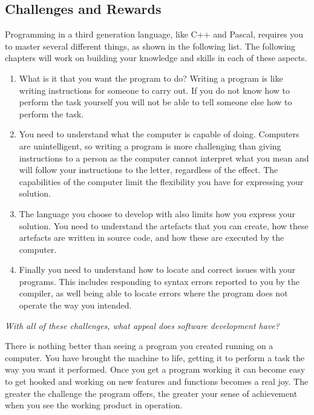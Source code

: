 \clearpage
\subsection{Challenges and Rewards} %
\label{sub:challenges_and_rewards}


Programming in a third generation language, like C++ and Pascal, requires you to master several different things, as shown in the following list. The following chapters will work on building your knowledge and skills in each of these aspects.

\begin{enumerate}
  \item What is it that you want the program to do? Writing a program is like writing instructions for someone to carry out. If you do not know how to perform the task yourself you will not be able to tell someone else how to perform the task.
  \item You need to understand what the computer is capable of doing. Computers are unintelligent, so writing a program is more challenging than giving instructions to a person as the computer cannot interpret what you mean and will follow your instructions to the letter, regardless of the effect. The capabilities of the computer limit the flexibility you have for expressing your solution.
  \item The language you choose to develop with also limits how you express your solution. You need to understand the artefacts that you can create, how these artefacts are written in source code, and how these are executed by the computer.
  \item Finally you need to understand how to locate and correct issues with your programs. This includes responding to syntax errors reported to you by the compiler, as well being able to locate errors where the program does not operate the way you intended. 
\end{enumerate}

\emph{With all of these challenges, what appeal does software development have?}

There is nothing better than seeing a program you created running on a computer. You have brought the machine to life, getting it to perform a task the way you want it performed. Once you get a program working it can become easy to get hooked and working on new features and functions becomes a real joy. The greater the challenge the program offers, the greater your sense of achievement when you see the working product in operation.

